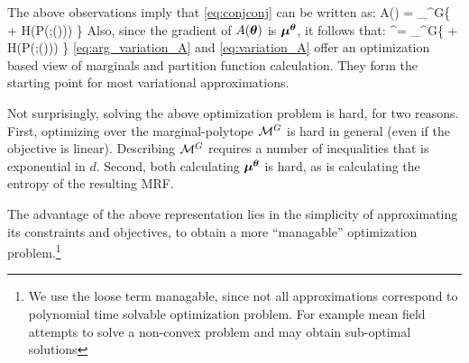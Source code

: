 The above observations imply that \eqref{eq:conjconj} can be written as:
\be
A(\thetav) = \sup_{\muv \in \margpoly^G}\left \{ \muv \cdot \thetav + H(P(\xx;\thetav(\muv))) \right\} \label{eq:variation_A} 
\ee
Also, since the gradient of $A(\boldsymbol{\theta})$ is $\boldsymbol{\mu}^{\boldsymbol{\theta}}$, it follows that:
\be
\muv^{\thetav}= \arg \sup_{\muv \in \margpoly^G}\left \{ \muv \cdot \thetav + H(P(\xx;\thetav(\muv))) \right\} \label{eq:arg_variation_A}
\ee
\eqref{eq:arg_variation_A} and \eqref{eq:variation_A} offer an optimization based view of marginals and partition function calculation. They form the starting point for most
variational approximations.


Not surprisingly, solving the above optimization problem is hard, for two reasons. First,  optimizing over the marginal-polytope ${\cal{M}}^G$ is hard in general (even if the objective is linear). Describing ${\cal{M}}^G$ requires a number of inequalities that is exponential in $d$.  Second, both calculating $\boldsymbol{\mu}^{\boldsymbol{\theta}}$ is hard, as is calculating the entropy of the resulting MRF.

The advantage of the above representation lies in the simplicity of approximating its constraints and objectives, to obtain a more ``managable'' optimization problem.\footnote{We use the loose term managable, since not all approximations correspond to polynomial time solvable optimization problem. For example mean field attempts to solve a non-convex problem and may obtain sub-optimal solutions}  
